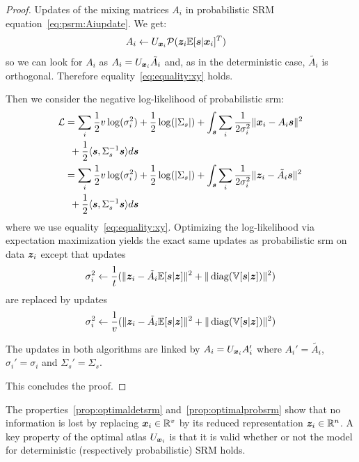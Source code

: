 \begin{proof}
  Updates of the mixing matrices $A_i$ in probabilistic SRM equation~\eqref{eq:psrm:Aiupdate}. We get:
  \begin{align}
    A_i &\leftarrow U_{\boldsymbol{x}_i}\mathcal{P}(\boldsymbol{z}_i \mathbb{E}[\boldsymbol{s}| \boldsymbol{x}_i]^T)
    \label{eq:fastprobsrm:Aiupdate}
  \end{align}
  so we can look for $A_i$ as $A_i = U_{\boldsymbol{x}_i} \tilde{A_i}$ and, as in the
  deterministic case, $\tilde{A_i}$ is orthogonal.
  Therefore equality~\eqref{eq:equality:xy} holds.
  
  Then we consider the negative log-likelihood of probabilistic srm:
  \begin{align}
    \mathcal{L} &= \sum_i \frac12 v\log(\sigma_i^2) + \frac12 \log(|\Sigma_s|) + \int_{\boldsymbol{s}} \sum_i \frac1{2 \sigma_i^{2}}\|\boldsymbol{x}_i - A_i \boldsymbol{s} \|^2 \\& \enspace + \frac12 \langle \boldsymbol{s} , \Sigma_s^{-1} \boldsymbol{s} \rangle  d\boldsymbol{s} \\
          &= \sum_i \frac12 v \log(\sigma_i^2) + \frac12 \log(|\Sigma_s|) + \int_{\boldsymbol{s}} \sum_i \frac1{2 \sigma_i^{2}}\|\boldsymbol{z}_i - \tilde{A_i} \boldsymbol{s} \|^2 \\& \enspace+ \frac12 \langle \boldsymbol{s} , \Sigma_s^{-1} \boldsymbol{s} \rangle  d\boldsymbol{s}
  \end{align}
  where we use equality~\eqref{eq:equality:xy}.
  Optimizing the log-likelihood via expectation maximization yields the exact
  same updates as probabilistic srm on data $\boldsymbol{z}_i$
  except that updates
  \begin{align}
    \sigma_i^2 \leftarrow \frac1{t} (\| \boldsymbol{z}_i - \tilde{A_i} \mathbb{E}[\boldsymbol{s}|\boldsymbol{z}]\|^2 + \| \operatorname*{diag}(\mathbb{V}[\boldsymbol{s} | \boldsymbol{z}]) \|^2)
  \end{align}
  are replaced by updates
  \begin{align}
    \sigma_i^2 \leftarrow \frac1{v} (\| \boldsymbol{z}_i - \tilde{A_i} \mathbb{E}[\boldsymbol{s}|\boldsymbol{z}]\|^2 + \| \operatorname*{diag}(\mathbb{V}[\boldsymbol{s} | \boldsymbol{z}]) \|^2)
  \end{align}

  The updates in both algorithms are linked  by $A_i = U_{\boldsymbol{x}_i}A_i'$ where
  $A_i' = \tilde{A_i}$, $\sigma_i' =
  \sigma_i$ and $\Sigma_s'  = \Sigma_s$.

  This concludes the proof.
\end{proof}

The properties~\ref{prop:optimaldetsrm} and~\ref{prop:optimalprobsrm} show that
no information is lost by replacing $\boldsymbol{x}_i \in \mathbb{R}^v$ by its reduced representation $\boldsymbol{z}_i \in \mathbb{R}^n$.
A key property of the optimal atlas $U_{\boldsymbol{x}_i}$ is that it is valid whether or
not the model for deterministic (respectively probabilistic) SRM holds.

